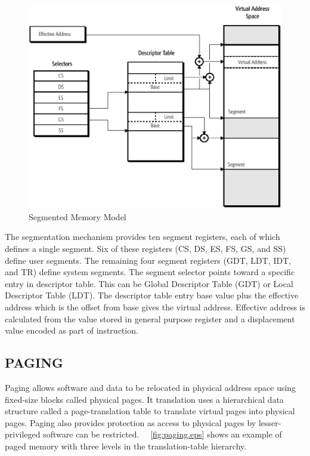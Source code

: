 \begin{figure}[H]
\centering
\includegraphics[scale=0.5]{./figures/segmentation.eps}
\caption{Segmented Memory Model}
\label{fig:segmentation.eps}
\end{figure}


The segmentation mechanism provides ten segment registers, each of which defines a single segment. Six of these registers (CS, DS, ES, FS, GS, and SS) define user segments. The remaining four segment registers (GDT, LDT, IDT, and TR) define system segments. The segment selector points toward a specific entry in descriptor table. This can be Global Descriptor Table (GDT) or Local Descriptor Table (LDT). The descriptor table entry base value plus the effective address which is the offset from base gives the virtual address. Effective address is calculated from the value stored in general purpose register and a displacement value encoded as part of instruction.

\subsection{PAGING}
Paging allows software and data to be relocated in physical address space using fixed-size blocks called physical pages. It translation uses a hierarchical data structure called a page-translation table to translate virtual pages into physical pages. Paging also provides protection as access to physical pages by lesser-privileged software can be restricted. ~\figurename {~\ref{fig:paging.eps}} shows an example of paged memory with three levels in the translation-table hierarchy. 




